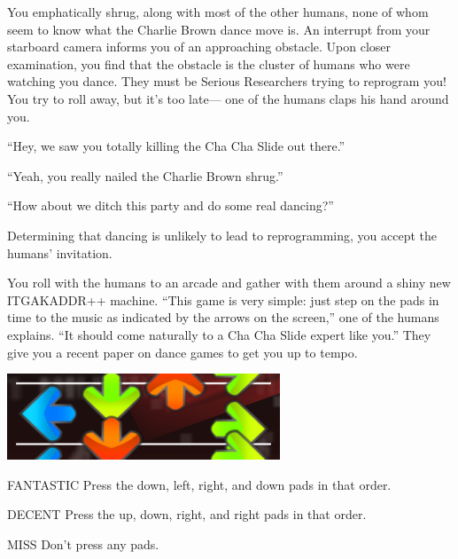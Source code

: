 You emphatically shrug, along with most of the other humans,
none of whom seem to know what the Charlie Brown dance move is.
An interrupt from your starboard camera informs you of an approaching obstacle.
Upon closer examination, you find that the obstacle is
the cluster of humans who were watching you dance.
They must be Serious Researchers trying to reprogram you!
You try to roll away, but it's too late---%
one of the humans claps his hand around you.

``Hey, we saw you totally killing the Cha Cha Slide out there.''

``Yeah, you really nailed the Charlie Brown shrug.''

``How about we ditch this party and do some real dancing?''

Determining that dancing is unlikely to lead to reprogramming,
you accept the humans' invitation.

You roll with the humans to an arcade
and gather with them around a shiny new ITGAKADDR++ machine.
``This game is very simple:
just step on the pads in time to the music
as indicated by the arrows on the screen,''
one of the humans explains.
``It should come naturally to a Cha Cha Slide expert like you.''
They give you a recent paper on dance games \citep{ben}
to get you up to tempo.

\begin{center}
  \includegraphics{itg-dlrd.png}
\end{center}

\begin{switch}
\item{FANTASTIC}
  Press the down, left, right, and down pads in that order.
\item{DECENT}
  Press the up, down, right, and right pads in that order.
\item{MISS}
  Don't press any pads.
\end{switch}


